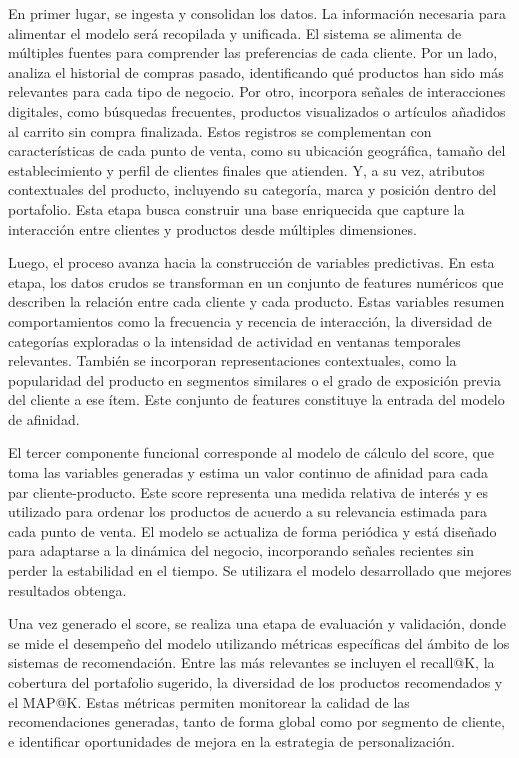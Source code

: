 \documentclass[
11pt, %
]{charter}
\begin{document}
En primer lugar, se ingesta y consolidan los datos. La información necesaria para alimentar el modelo será recopilada y unificada. El sistema se alimenta de múltiples fuentes para comprender las preferencias de cada cliente. Por un lado, analiza el historial de compras pasado, identificando qué productos han sido más relevantes para cada tipo de negocio. Por otro, incorpora señales de interacciones digitales, como búsquedas frecuentes, productos visualizados o artículos añadidos al carrito sin compra finalizada. Estos registros se complementan con características de cada punto de venta, como su ubicación geográfica, tamaño del establecimiento y perfil de clientes finales que atienden. Y, a su vez, atributos contextuales del producto, incluyendo su categoría, marca y posición dentro del portafolio. Esta etapa busca construir una base enriquecida que capture la interacción entre clientes y productos desde múltiples dimensiones.

Luego, el proceso avanza hacia la construcción de variables predictivas. En esta etapa, los datos crudos se transforman en un conjunto de features numéricos que describen la relación entre cada cliente y cada producto. Estas variables resumen comportamientos como la frecuencia y recencia de interacción, la diversidad de categorías exploradas o la intensidad de actividad en ventanas temporales relevantes. También se incorporan representaciones contextuales, como la popularidad del producto en segmentos similares o el grado de exposición previa del cliente a ese ítem. Este conjunto de features constituye la entrada del modelo de afinidad.

El tercer componente funcional corresponde al modelo de cálculo del score, que toma las variables generadas y estima un valor continuo de afinidad para cada par cliente-producto. Este score representa una medida relativa de interés y es utilizado para ordenar los productos de acuerdo a su relevancia estimada para cada punto de venta. El modelo se actualiza de forma periódica y está diseñado para adaptarse a la dinámica del negocio, incorporando señales recientes sin perder la estabilidad en el tiempo. Se utilizara el modelo desarrollado que mejores resultados obtenga.

Una vez generado el score, se realiza una etapa de evaluación y validación, donde se mide el desempeño del modelo utilizando métricas específicas del ámbito de los sistemas de recomendación. Entre las más relevantes se incluyen el recall@K, la cobertura del portafolio sugerido, la diversidad de los productos recomendados y el MAP@K. Estas métricas permiten monitorear la calidad de las recomendaciones generadas, tanto de forma global como por segmento de cliente, e identificar oportunidades de mejora en la estrategia de personalización.
\end{document}
